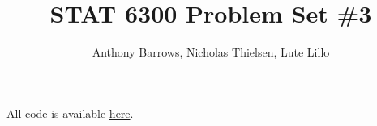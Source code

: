 \documentclass[]{article}
\title{STAT 6300 Problem Set \#3}
\author{Anthony Barrows, Nicholas Thielsen, Lute Lillo}
\begin{document}
\maketitle

All code is available \href{https://github.com/ajbarrows/uvmbayes/blob/main/notebooks/problem_sets/20240927-problem_set_3.ipynb}{here}.

\section{}







\section{}



\section{}


\end{document}
